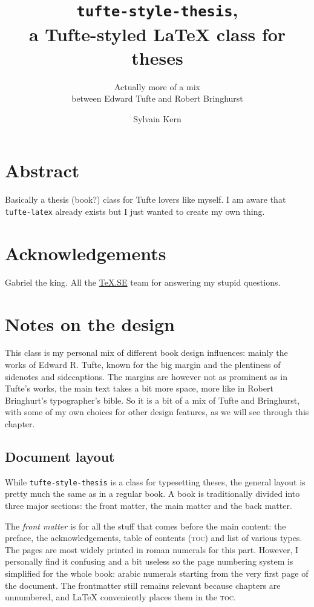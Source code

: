 \documentclass[
    11pt,
]{tufte-style-thesis}
\author{Sylvain Kern}
\title{\texttt{tufte-style-thesis},\\a Tufte-styled \LaTeX{} class for theses}
\subtitle{Actually more of a mix\\between Edward Tufte and Robert Bringhurst}
\begin{document}
\maketitle

\frontmatter

\chapter{Abstract}
Basically a thesis (book?) class for Tufte lovers like myself. I am aware that \texttt{tufte-latex} already exists but I just wanted to create my own thing.


\chapter{Acknowledgements}
Gabriel the king. All the \href{https://tex.stackexchange.com/}{\TeX.SE} team for answering my stupid questions.

\tableofcontents
\listoffigures
\listoftables
\listoflistings


\mainmatter

\chapter{Notes on the design}

This class is my personal mix of different book design influences: mainly the works of Edward R. Tufte, known for the big margin and the plentiness of sidenotes and sidecaptions. The margins are however not as prominent as in Tufte's works, the main text takes a bit more space, more like in Robert Bringhurt's typographer's bible. So it is a bit of a mix of Tufte and Bringhurst, with some of my own choices for other design features, as we will see through this chapter.

\section{Document layout}

While \texttt{tufte-style-thesis} is a class for typesetting theses, the general layout is pretty much the same as in a regular book. A book is traditionally divided into three major sections: the front matter, the main matter and the back matter.

The \textit{front matter} is for all the stuff that comes before the main content: the preface, the acknowledgements, table of contents (\textsc{toc}) and list of various types. The pages are most widely printed in roman numerals for this part. However, I personally find it confusing and a bit useless so the page numbering system is simplified for the whole book: arabic numerals starting from the very first page of the document. The frontmatter still remains relevant because chapters are unnumbered, and \LaTeX{} conveniently places them in the \textsc{toc}.
\end{document}
